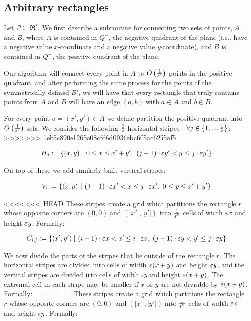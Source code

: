 \documentclass[12pt]{article}%
\begin{document}
\subsection{Arbitrary rectangles}

Let $P\subseteq \Re^2$. We first describe a subroutine for connecting two sets of points, $A$ and $B$, where $A$ is contained in $Q^-$, the negative quadrant of the plane (i.e., have a negative value $x$-coordinate and a negative value $y$-coordinate), and $B$ is contained in $Q^+$, the positive quadrant of the plane. 

Our algorithm will connect every point in $A$ to $O\left(\frac{1}{\varepsilon^2}\right)$ points in the positive quadrant, and after performing the same process for the points of the symmetrically defined $B'$, we will have that every rectangle that truly contains points from $A$ and $B$ will have an edge $(a,b)$ with $a\in A$ and $b\in B$.

For every point $a = (x',y') \in A$ we define partition the positive quadrant into $O\left(\frac{1}{\varepsilon^2}\right)$ sets. We consider the following $\frac{1}{\varepsilon}$ horizontal stripes - $\forall j\in \{1,...,\frac{1}{\varepsilon}\}$:
>>>>>>> 1eb5c890e1265a08cfd6d0936ebc605ac6255af5

$$H_{j}:=\{(x,y)~|~  0 \leq x \leq x'+y'  ,~ (j-1)\cdot \varepsilon y' < y \leq j\cdot \varepsilon y'\}$$

On top of these we add similarly built vertical stripes:

$$V_{i}:=\{(x,y)~|~ (j-1)\cdot \varepsilon x' < x \leq j\cdot \varepsilon x',~ 0 \leq y \leq x'+y' \}$$

<<<<<<< HEAD
These stripes create a grid which partitions the rectangle $r$ whose
opposite corners are $(0,0)$ and $(|x'|,|y'|)$ into $\frac{1}{\varepsilon^2}$
cells of width $\varepsilon x$ and height $\varepsilon y$. Formally:

$$C_{i,j}:=\{(x',y')~|~  (i-1)\cdot \varepsilon x < x' \leq i\cdot \varepsilon x,~ (j-1)\cdot \varepsilon y< y' \leq j\cdot \varepsilon y\}$$

We now divide the parts of the stripes that lie outside of the
rectangle $r$. The horizontal stripes are divided into cells of width
$\varepsilon(x+y)$ and height $\varepsilon y$, and the vertical stripes are divided
into cells of width $\varepsilon y$and height $\varepsilon(x+y)$. The extremal cell
in each stripe may be smaller if $x$ or $y$ are not divisible by
$\varepsilon(x+y)$. Formally:
=======
These stripes create a grid which partitions the rectangle $r$ whose opposite corners are $(0,0)$ and $(|x'|,|y'|)$ into $\frac{1}{\varepsilon^2}$ cells of width $\varepsilon x$ and height $\varepsilon y$. Formally:
\end{document}
